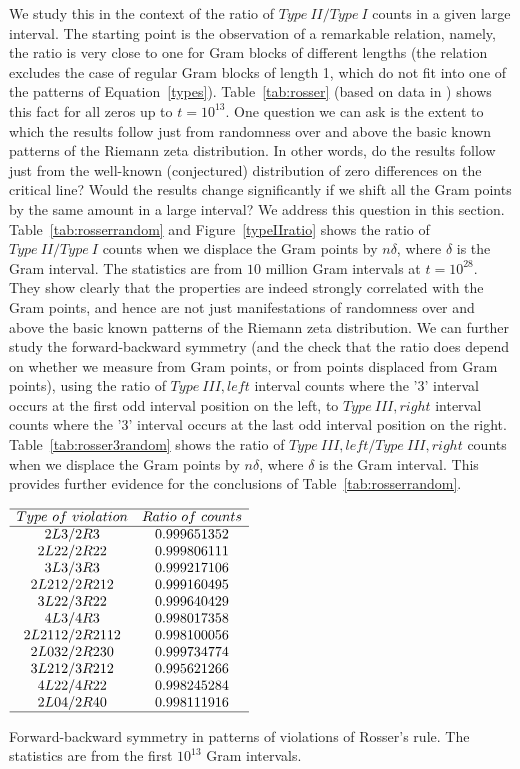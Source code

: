 \documentclass[twoside]{article}
\theoremstyle{definition}
\begin{document}
We study this in the context of the ratio of $Type~II/Type~I$ counts in a given large interval. The starting point is the observation of a remarkable relation, namely, the ratio is very close to one for Gram blocks of different lengths (the relation excludes the case of regular Gram blocks of length 1, which do not fit into one of the patterns of Equation~\ref{types}).   Table~\ref{tab:rosser}  (based on data in \cite{gourdon}) shows this fact for all zeros up to $t = 10^{13}$. One question we can ask is the extent to which the results follow just from randomness over and above the basic known patterns of the Riemann zeta distribution. In other words, do the results follow just from the well-known (conjectured) distribution of zero differences on the critical line? Would the results change significantly if we shift all the Gram points  by the same amount in a large interval? We address this question in this section. Table~\ref{tab:rosserrandom} and Figure~\ref{typeIIratio} shows the ratio of $Type~II/Type~I$ counts when we displace the Gram points by $n\delta$, where $\delta$ is the Gram interval. The statistics are from $10$ million Gram intervals at $t=10^{28}$.
They  show clearly that the properties are indeed strongly correlated with the Gram points, and hence are not just manifestations of randomness over and above the basic known patterns of the Riemann zeta distribution. 
We can further study the forward-backward symmetry (and the check that the ratio does depend on whether we measure from Gram points, or from points displaced from Gram points), using the ratio of  $Type~III,left$ interval counts where the '3' interval occurs at the first odd interval position on the left, to  $Type~III,right$ interval counts where the '3' interval occurs at the last odd interval position on the right. 
Table~\ref{tab:rosser3random} shows the ratio of $Type~III,left/Type~III,right$ counts when we displace the Gram points by $n\delta$, where $\delta$ is the Gram interval. This provides further evidence for the conclusions of Table~\ref{tab:rosserrandom}.
  
\begin{table}
\centering \(\begin{array}{cc}
\hline
Type~of~violation &Ratio~of~counts\\
\hline
2L3/2R3 &0.999651352\\
2L22/2R22 &0.999806111\\
3L3/3R3 &0.999217106\\
2L212/2R212 &0.999160495\\
3L22/3R22 &0.999640429\\
4L3/4R3 &0.998017358\\
2L2112/2R2112 &0.998100056\\
2L032/2R230 &0.999734774\\
3L212/3R212 &0.995621266\\
4L22/4R22 &0.998245284\\
2L04/2R40 &0.998111916\\
\hline
\end{array}\)
\caption{Forward-backward symmetry in patterns of violations of Rosser's rule.  The statistics are from the first $10^{13}$ Gram intervals.} \label{tab:vrr}
\end{table}
\end{document}
